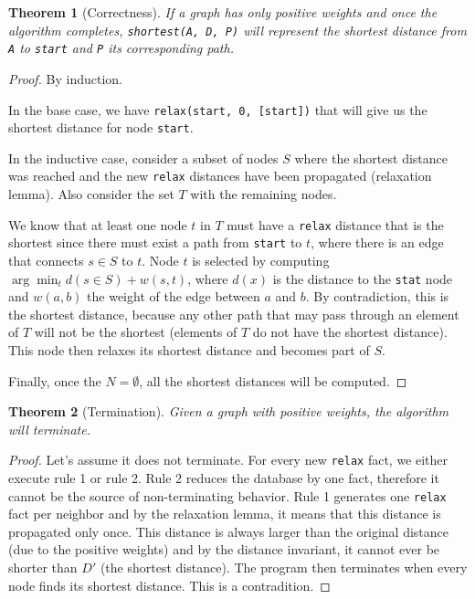 \documentclass[9pt]{article}
\newtheorem{theorem}{Theorem}
\newcommand{\argmin}{\arg\!\min}
\begin{document}
\begin{theorem}[Correctness]
If a graph has only positive weights and once the algorithm completes, \texttt{shortest(A, D, P)} will represent the shortest distance from \texttt{A} to \texttt{start} and \texttt{P} its corresponding path.
\end{theorem}
\begin{proof}
By induction.

In the base case, we have \texttt{relax(start, 0, [start])} that will give us the shortest distance for node \texttt{start}.

In the inductive case, consider a subset of nodes $S$ where the shortest distance was reached and the new \texttt{relax} distances have been propagated (relaxation lemma). Also consider the set $T$ with the remaining nodes.

We know that at least one node $t$ in $T$ must have a \texttt{relax} distance that is the shortest since there must exist a path from \texttt{start} to $t$, where there is an edge that connects $s \in S$ to $t$.
Node $t$ is selected by computing $\argmin_t d(s \in S) + w(s, t)$, where $d(x)$ is the distance to the \texttt{stat} node and $w(a, b)$ the weight of the edge between $a$ and $b$.
By contradiction, this is the shortest distance, because any other path that may pass through an element of $T$ will not be the shortest (elements of $T$ do not have the shortest distance). This node then relaxes its shortest distance and becomes part of $S$.

Finally, once the $N = \emptyset$, all the shortest distances will be computed.
\end{proof}

\begin{theorem}[Termination]
Given a graph with positive weights, the algorithm will terminate.
\end{theorem}
\begin{proof}
Let's assume it does not terminate. For every new \texttt{relax} fact, we either execute rule 1 or rule 2. Rule 2 reduces the database by one fact, therefore it cannot be the source of non-terminating behavior. Rule 1 generates one \texttt{relax} fact per neighbor and by the relaxation lemma, it means that this distance is propagated only once. This distance is always larger than the original distance (due to the positive weights) and by the distance invariant, it cannot ever be shorter than $D'$ (the shortest distance). The program then terminates when every node finds its shortest distance. This is a contradition.
\end{proof}
\end{document}

